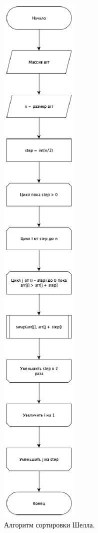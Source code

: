 \documentclass[12pt]{report}
\begin{document}
	
	\begin{figure}[H]
		\centering
		\includegraphics[width=0.22\linewidth]{Shell}
		\caption{Алгоритм сортировки Шелла.}
		\label{ris:image1}
	\end{figure}

\newpage
\end{document}
